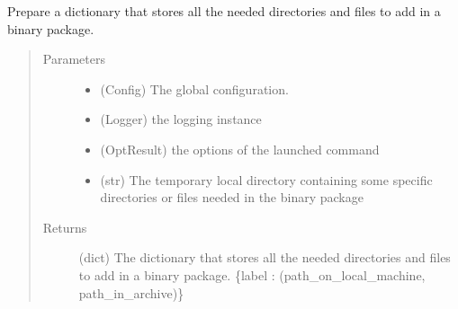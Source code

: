 \documentclass[a4paper,10pt,english]{sphinxmanual}
\begin{document}
\begin{fulllineitems}
\label{\detokenize{apidoc_commands/commands:commands.package.binary_package}}
Prepare a dictionary that stores all the needed directories and files 
to add in a binary package.
\begin{quote}\begin{description}
\item[{Parameters}] \leavevmode\begin{itemize}
\item {} 
 \textendash{} (Config) The global configuration.

\item {} 
 \textendash{} (Logger) the logging instance

\item {} 
 \textendash{} (OptResult) the options of the launched command

\item {} 
 \textendash{} (str) 
The temporary local directory containing some specific directories
or files needed in the binary package

\end{itemize}

\item[{Returns}] \leavevmode
(dict) 
The dictionary that stores all the needed directories and files 
to add in a binary package.
\{label : (path\_on\_local\_machine, path\_in\_archive)\}

\end{description}\end{quote}

\end{fulllineitems}

\end{document}
